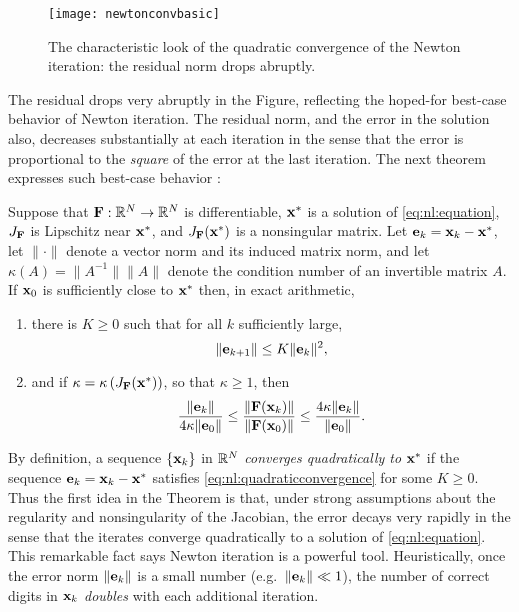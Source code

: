 \begin{figure}
\texttt{[image: newtonconvbasic]}
\caption{The characteristic look of the quadratic convergence of the Newton iteration: the residual norm drops abruptly.}
\label{fig:newtonconvbasic}
\end{figure}

The residual drops very abruptly in the Figure, reflecting the hoped-for best-case behavior of Newton iteration.  The residual norm, and the error in the solution also, decreases substantially at each iteration in the sense that the error is proportional to the \emph{square} of the error at the last iteration.  The next theorem expresses such best-case behavior \citep[Theorems 1.1 and inequalities (1.13)]{Kelley2003}:

\begin{theorem}
Suppose that $\mathbf{F}:\mathbb{R}^N\to\mathbb{R}^N$ is differentiable, $\mathbf{x}^*$ is a solution of \eqref{eq:nl:equation}, $J_{\mathbf{F}}$ is Lipschitz near $\mathbf{x}^*$, and $J_{\mathbf{F}}(\mathbf{x}^*)$ is a nonsingular matrix.  Let $\mathbf{e}_k=\mathbf{x}_k-\mathbf{x}^*$, let $\|\cdot\|$ denote a vector norm and its induced matrix norm, and let $\kappa(A)=\|A^{-1}\| \|A\|$ denote the condition number of an invertible matrix $A$.  If $\mathbf{x}_0$ is sufficiently close to $\mathbf{x}^*$ then, in exact arithmetic,
\renewcommand{\labelenumi}{(\roman{enumi})}
\begin{enumerate}
\item there is $K\ge 0$ such that for all $k$ sufficiently large,
\begin{equation}
	\|\mathbf{e}_{k+1}\| \le K \|\mathbf{e}_k\|^2, \label{eq:nl:quadraticconvergence}
\end{equation}
\item and if $\kappa = \kappa\left(J_{\mathbf{F}}(\mathbf{x}^*)\right)$, so that $\kappa\ge 1$, then
\begin{equation}
	\frac{\|\mathbf{e}_k\|}{4 \kappa \|\mathbf{e}_0\|} \le \frac{\|\mathbf{F}(\mathbf{x}_k)\|}{\|\mathbf{F}(\mathbf{x}_0)\|} \le \frac{4 \kappa \|\mathbf{e}_k\|}{\|\mathbf{e}_0\|}. \label{eq:nl:errorresidualnormequiv}
\end{equation}
\end{enumerate}
\end{theorem}

By definition, a sequence $\{\mathbf{x}_k\}$ in $\mathbb{R}^N$ \emph{converges quadratically to} $\mathbf{x}^*$ if the sequence $\mathbf{e}_k=\mathbf{x}_k-\mathbf{x}^*$ satisfies \eqref{eq:nl:quadraticconvergence} for some $K\ge 0$.  Thus the first idea in the Theorem is that, under strong assumptions about the regularity and nonsingularity of the Jacobian, the error decays very rapidly in the sense that the iterates converge quadratically to a solution of \eqref{eq:nl:equation}.  This remarkable fact says Newton iteration is a powerful tool.  Heuristically, once the error norm $\|\mathbf{e}_k\|$ is a small number (e.g.~$\|\mathbf{e}_k\| \ll 1$), the number of correct digits in $\mathbf{x}_k$ \emph{doubles} with each additional iteration.

